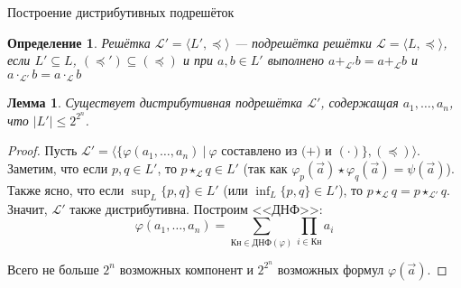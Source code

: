 \documentclass[aspectratio=169]{beamer}
\newtheorem{dfn}{Определение}[section]
\newtheorem{lmm}{Лемма}[section]
\begin{document}
\newcommand\doubleplus{+\kern-1.3ex+\kern0.8ex}
\newcommand\mdoubleplus{\ensuremath{\mathbin{+\mkern-10mu+}}}

\begin{frame}{Построение дистрибутивных подрешёток}
\begin{dfn}Решётка $\mathcal{L'} = \langle L', \preceq \rangle$ --- подрешётка решётки $\mathcal{L} = \langle L, \preceq \rangle$, 
если $L' \subseteq L$, $(\preceq') \subseteq (\preceq)$ и 
при $a,b \in L'$ выполнено $a +_{\mathcal{L'}} b = a +_{\mathcal{L}} b$ и $a \cdot_{\mathcal{L'}} b = a \cdot_{\mathcal{L}} b$
\end{dfn}
\begin{lmm}Существует дистрибутивная подрешётка $\mathcal{L'}$, содержащая
$a_1, \dots, a_n$, что $|L'| \le 2^{2^n}$.
\end{lmm}
\begin{proof}
Пусть $\mathcal{L'} = \langle\{ \varphi(a_1,\dots,a_n)\ |\ \varphi \text{ составлено из (+) и }(\cdot)\}, (\preceq)\rangle$.
Заметим, что если $p,q \in L'$, то $p \star_{\mathcal{L}} q \in L'$ 
(так как $\varphi_p(\overrightarrow{a})\star\varphi_q(\overrightarrow{a}) = \psi(\overrightarrow{a})$). Также ясно,
что если $\sup_L\{p,q\} \in L'$ (или $\inf_L\{p,q\} \in L'$), то $p \star_{\mathcal{L}} q = p \star_{\mathcal{L'}} q$.
Значит, $\mathcal{L'}$ также дистрибутивна. Построим <<ДНФ>>:
$$\varphi(a_1,\dots,a_n) = \sum_{\text{Кн} \in \text{ДНФ}(\varphi)}\prod_{i \in \text{Кн}}a_i$$

Всего не больше $2^n$ возможных компонент и $2^{2^n}$ возможных формул $\varphi(\overrightarrow{a})$.
\end{proof}
\end{frame}
\end{document}
